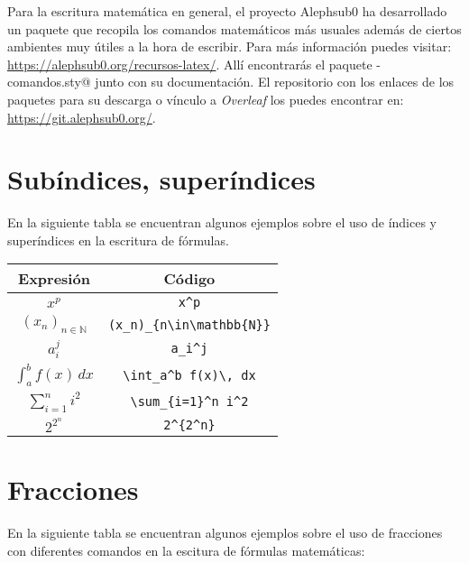 \documentclass[a4,10pt]{aleph-notas}
\newcommand{\N}{\mathbb{N}}
\theoremstyle{definition}
\theoremstyle{plain}
\begin{document}
\newcommand{\suc}[2][n]{\left(#2\right)_{#1\in\mathbb{\N}}}

\begin{center}
    \fbox{$\suc{x_n}$}
\end{center}

Para la escritura matemática en general, el proyecto Alephsub0 ha desarrollado un paquete que recopila los comandos matemáticos más usuales además de ciertos ambientes muy útiles a la hora de escribir. Para más información puedes visitar: \href{https://alephsub0.org/recursos-latex/}{https://alephsub0.org/recursos-latex/}. Allí encontrarás el paquete \verb@aleph-comandos.sty@ junto con su documentación. El repositorio con los enlaces de los paquetes para su descarga o vínculo a \emph{Overleaf} los puedes encontrar en: \href{https://git.alephsub0.org/}{https://git.alephsub0.org/}.

\section{Subíndices, superíndices}

En la siguiente tabla se encuentran algunos ejemplos sobre el uso de índices y superíndices en la escritura de fórmulas.

\begin{center}
    \begin{tabular}{|c|c|}
        \hline
        Expresión & Código  \\ \hline
        $x^p$ & \verb"x^p" \\ \hline
        $(x_n)_{n\in\mathbb{N}}$ & \verb"(x_n)_{n\in\mathbb{N}}" \\ \hline
        $a_i^j$ & \verb"a_i^j" \\ \hline
        $\int_a^b f(x)\, dx$ & \verb"\int_a^b f(x)\, dx"\\ \hline
        $\sum_{i=1}^n i^2$ & \verb"\sum_{i=1}^n i^2" \\ \hline
        $2^{2^n}$ & \verb"2^{2^n}" \\ \hline 
    \end{tabular}
\end{center}

\section{Fracciones}

En la siguiente tabla se encuentran algunos ejemplos sobre el uso de fracciones con diferentes comandos en la escitura de fórmulas matemáticas:
\end{document}
